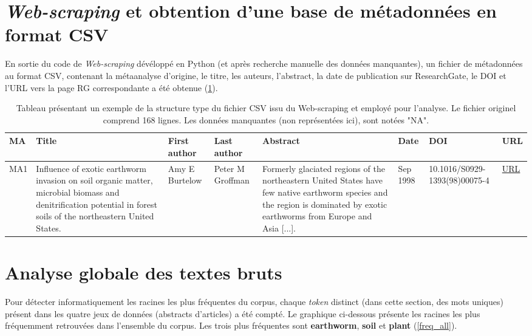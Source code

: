 \documentclass{book}
\begin{document}
\section{\textit{Web-scraping} et obtention d'une base de métadonnées en format CSV}
\noindent
En sortie du code de \textit{Web-scraping} dévéloppé en Python (et après recherche manuelle des données manquantes), un fichier de métadonnées au format CSV, contenant la métaanalyse d'origine, le titre, les auteurs, l'abstract, la date de publication sur ResearchGate, le DOI et l'URL vers la page RG correspondante a été obtenue (\cref{Table 1}). 
\begin{table}[H]
    \begin{tabular}{|p{0.7cm}|p{2cm}|p{1.5cm}|p{1.5cm}|p{3cm}|p{1.4cm}|p{2.1cm}|p{1cm}|}
      \hline
      \textbf{MA} & \textbf{Title} & \textbf{First author} & \textbf{Last author} & \textbf{Abstract} & \textbf{Date} & \textbf{DOI} & \textbf{URL} 
       \\
       \hline
      MA1 &
      Influence of exotic earthworm invasion on soil organic matter, microbial biomass and denitrification potential in forest soils of the northeastern United States. &
      Amy E Burtelow &
      Peter M Groffman &
      Formerly glaciated regions of the northeastern United States have few native earthworm species and the region is dominated by exotic earthworms from Europe and Asia [...]. &
      Sep 1998 &
      10.1016/S0929-1393(98)00075-4 &
      \href{https://www.researchgate.net/publication/222504320_Influence_of_exotic_earthworm_invasion_on_soil_organic_matter_microbial_biomass_and_denitrification_potential_in_forest_soils_of_the_northeastern_United_States?\_sg=Yv_a-THpFLD4vDUrl0rXvw4YNA6TBSRqNj_obWyLYzEIp3c_WKtxs7crdoVE05VQwdF5S5LHlSvHMqs}{URL}
       \\
       \hline
    \end{tabular}
    \caption[Table 1]{Tableau présentant un exemple de la structure type du fichier CSV issu du Web-scraping et employé pour l'analyse. Le fichier originel comprend 168 lignes. Les données manquantes (non représentées ici), sont notées "NA".\label{Table 1}}
    \end{table}

\newpage
\section{Analyse globale des textes bruts}
\noindent
Pour détecter informatiquement les racines les plus fréquentes du corpus, chaque \textit{token} distinct (dans cette section, des mots uniques) présent dans les quatre jeux de données (abstracts d'articles) a été compté.  Le graphique ci-dessous présente les racines les plus fréquemment retrouvées dans l'ensemble du corpus. Les trois plus fréquentes sont \textbf{earthworm}, \textbf{soil} et \textbf{plant} (\cref{freq_all}).
\end{document}
